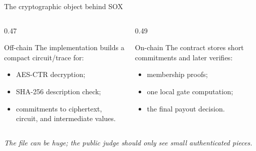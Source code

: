 \documentclass[aspectratio=169,10pt]{beamer}
\begin{document}
\begin{frame}{The cryptographic object behind SOX}
  \begin{columns}[T,onlytextwidth]
    \begin{column}{0.47\textwidth}
      \begin{block}{Off-chain}
        The implementation builds a compact circuit/trace for:
        \begin{itemize}
          \item AES-CTR decryption;
          \item SHA-256 description check;
          \item commitments to ciphertext, circuit, and intermediate values.
        \end{itemize}
      \end{block}
    \end{column}
    \begin{column}{0.49\textwidth}
      \begin{block}{On-chain}
        The contract stores short commitments and later verifies:
        \begin{itemize}
          \item membership proofs;
          \item one local gate computation;
          \item the final payout decision.
        \end{itemize}
      \end{block}
    \end{column}
  \end{columns}
  \vfill
  \centering
  \textit{The file can be huge; the public judge should only see small authenticated pieces.}
\end{frame}
\end{document}
